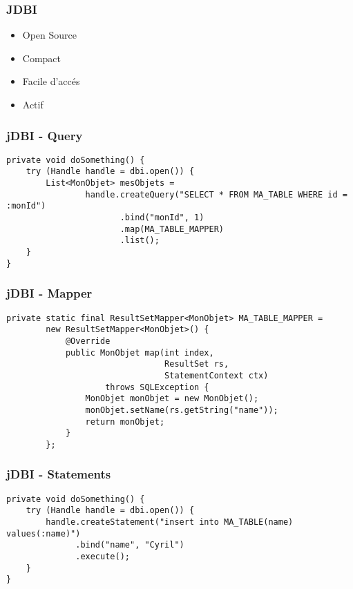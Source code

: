 \documentclass[t,12pt]{beamer}
\begin{document}
\begin{frame}
	\frametitle{JDBI}

	\begin{itemize}
		\item Open Source
		\item Compact
		\item Facile d'acc\'es
		\item Actif
	\end{itemize}
\end{frame}

\begin{frame}[fragile]
	\frametitle{jDBI - Query}

	\begin{lstlisting}[frame=single]
private void doSomething() {
    try (Handle handle = dbi.open()) {
        List<MonObjet> mesObjets =
                handle.createQuery("SELECT * FROM MA_TABLE WHERE id = :monId")
                       .bind("monId", 1)
                       .map(MA_TABLE_MAPPER)
                       .list();
    }
}
	\end{lstlisting}
\end{frame}

\begin{frame}[fragile]
	\frametitle{jDBI - Mapper}

	\begin{lstlisting}[frame=single]
private static final ResultSetMapper<MonObjet> MA_TABLE_MAPPER =
        new ResultSetMapper<MonObjet>() {
            @Override
            public MonObjet map(int index,
                                ResultSet rs,
                                StatementContext ctx)
                    throws SQLException {
                MonObjet monObjet = new MonObjet();
                monObjet.setName(rs.getString("name"));
                return monObjet;
            }
        };
	\end{lstlisting}
\end{frame}

\begin{frame}[fragile]
	\frametitle{jDBI - Statements}

	\begin{lstlisting}[frame=single]
private void doSomething() {
    try (Handle handle = dbi.open()) {
        handle.createStatement("insert into MA_TABLE(name) values(:name)")
              .bind("name", "Cyril")
              .execute();
    }
}
	\end{lstlisting}
\end{frame}
\end{document}
